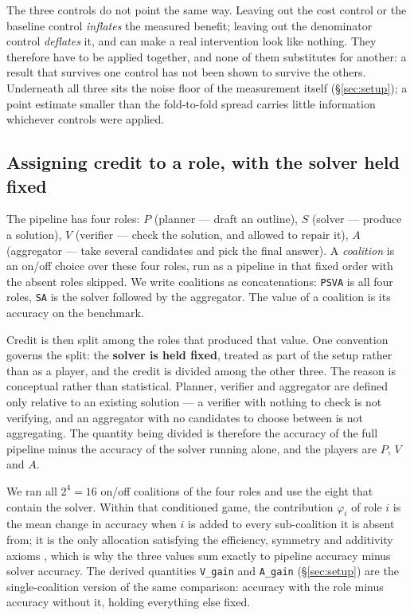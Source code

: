 \documentclass[11pt,a4paper]{article}
\begin{document}
The three controls do not point the same way. Leaving out the cost control or the baseline control
\emph{inflates} the measured benefit; leaving out the denominator control \emph{deflates} it, and
can make a real intervention look like nothing. They therefore have to be applied together, and
none of them substitutes for another: a result that survives one control has not been shown to
survive the others. Underneath all three sits the noise floor of the measurement itself
(\S\ref{sec:setup}); a point estimate smaller than the fold-to-fold spread carries little
information whichever controls were applied.

\subsection{Assigning credit to a role, with the solver held fixed}\label{sec:credit}

The pipeline has four roles: $P$ (planner --- draft an outline), $S$ (solver --- produce a
solution), $V$ (verifier --- check the solution, and allowed to repair it), $A$ (aggregator ---
take several candidates and pick the final answer). A \emph{coalition} is an on/off choice over
these four roles, run as a pipeline in that fixed order with the absent roles skipped. We write
coalitions as concatenations: \texttt{PSVA} is all four roles, \texttt{SA} is the solver followed
by the aggregator. The value of a coalition is its accuracy on the benchmark.

Credit is then split among the roles that produced that value. One convention governs the split:
the \textbf{solver is held fixed}, treated as part of the setup rather than as a player, and the
credit is divided among the other three. The reason is conceptual rather than statistical. Planner,
verifier and aggregator are defined only relative to an existing solution --- a verifier with
nothing to check is not verifying, and an aggregator with no candidates to choose between is not
aggregating. The quantity being divided is therefore the accuracy of the full pipeline minus the
accuracy of the solver running alone, and the players are $P$, $V$ and $A$.

We ran all $2^4 = 16$ on/off coalitions of the four roles and use the eight that contain the
solver. Within that conditioned game, the contribution $\varphi_i$ of role $i$ is the mean change
in accuracy when $i$ is added to every sub-coalition it is absent from; it is the only allocation
satisfying the efficiency, symmetry and additivity axioms \cite{shapley1953}, which is why the
three values sum exactly to pipeline accuracy minus solver accuracy. The derived quantities
\texttt{V\_gain} and \texttt{A\_gain} (\S\ref{sec:setup}) are the single-coalition version of the
same comparison: accuracy with the role minus accuracy without it, holding everything else fixed.
\end{document}
